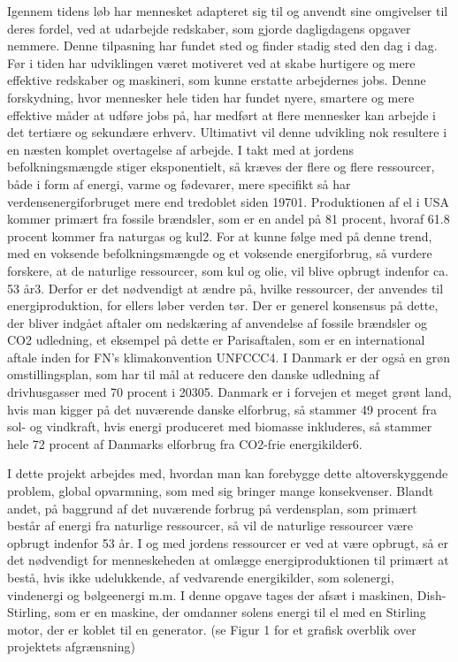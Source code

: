 Igennem tidens løb har mennesket adapteret sig til og anvendt sine omgivelser til deres fordel, ved at udarbejde redskaber, som gjorde dagligdagens opgaver nemmere. Denne tilpasning har fundet sted og finder stadig sted den dag i dag. Før i tiden har udviklingen været motiveret ved at skabe hurtigere og mere effektive redskaber og maskineri, som kunne erstatte arbejdernes jobs. Denne forskydning, hvor mennesker hele tiden har fundet nyere, smartere og mere effektive måder at udføre jobs på, har medført at flere mennesker kan arbejde i det tertiære og sekundære erhverv. Ultimativt vil denne udvikling nok resultere i en næsten komplet overtagelse af arbejde. I takt med at jordens befolkningsmængde stiger eksponentielt, så kræves der flere og flere ressourcer, både i form af energi, varme og fødevarer, mere specifikt så har verdensenergiforbruget mere end tredoblet siden 19701. Produktionen af el i USA kommer primært fra fossile brændsler, som er en andel på 81 procent, hvoraf 61.8 procent kommer fra naturgas og kul2. For at kunne følge med på denne trend, med en voksende befolkningsmængde og et voksende energiforbrug, så vurdere forskere, at de naturlige ressourcer, som kul og olie, vil blive opbrugt indenfor ca. 53 år3.  Derfor er det nødvendigt at ændre på, hvilke ressourcer, der anvendes til energiproduktion, for ellers løber verden tør. Der er generel konsensus på dette, der bliver indgået aftaler om nedskæring af anvendelse af fossile brændsler og CO2 udledning, et eksempel på dette er Parisaftalen, som er en international aftale inden for FN’s klimakonvention UNFCCC4. I Danmark er der også en grøn omstillingsplan, som har til mål at reducere den danske udledning af drivhusgasser med 70 procent i 20305. Danmark er i forvejen et meget grønt land, hvis man kigger på det nuværende danske elforbrug, så stammer 49 procent fra sol- og vindkraft, hvis energi produceret med biomasse inkluderes, så stammer hele 72 procent af Danmarks elforbrug fra CO2-frie energikilder6.  

I dette projekt arbejdes med, hvordan man kan forebygge dette altoverskyggende problem, global opvarmning, som med sig bringer mange konsekvenser. Blandt andet, på baggrund af det nuværende forbrug på verdensplan, som primært består af energi fra naturlige ressourcer, så vil de naturlige ressourcer være opbrugt indenfor 53 år. I og med jordens ressourcer er ved at være opbrugt, så er det nødvendigt for menneskeheden at omlægge energiproduktionen til primært at bestå, hvis ikke udelukkende, af vedvarende energikilder, som solenergi, vindenergi og bølgeenergi m.m. I denne opgave tages der afsæt i maskinen, Dish-Stirling, som er en maskine, der omdanner solens energi til el med en Stirling motor, der er koblet til en generator. (se Figur 1 for et grafisk overblik over projektets afgrænsning) 